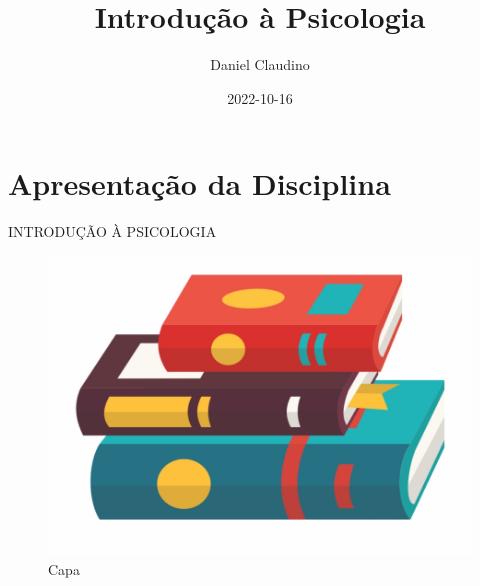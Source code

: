 \documentclass[
]{book}
\title{Introdução à Psicologia}
\author{Daniel Claudino}
\date{2022-10-16}
\begin{document}
\maketitle

{
\setcounter{tocdepth}{1}
\tableofcontents
}
\hypertarget{apresentauxe7uxe3o-da-disciplina}{%
\chapter{Apresentação da Disciplina}\label{apresentauxe7uxe3o-da-disciplina}}

INTRODUÇÃO À PSICOLOGIA

\begin{figure}

{\centering \includegraphics[width=0.5\linewidth]{figuras/LIVRO-GENERICO} 

}

\caption{Capa}\label{fig:unnamed-chunk-1}
\end{figure}
\end{document}

